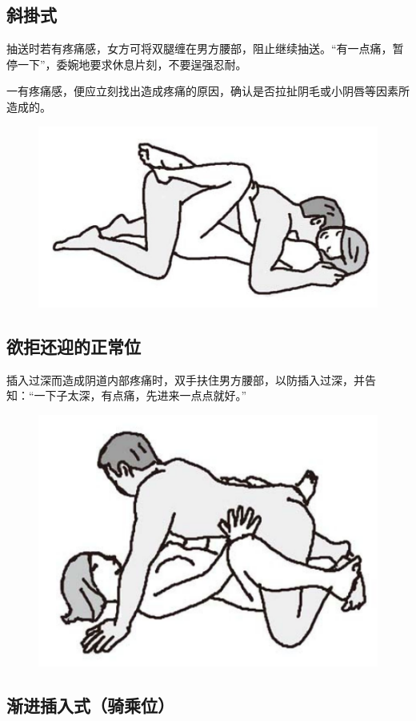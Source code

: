\documentclass[12pt,UTF8]{ctexbook}
\begin{document}
\subsection{斜掛式}

抽送时若有疼痛感，女方可将双腿缠在男方腰部，阻止继续抽送。“有一点痛，暂停一下”，委婉地要求休息片刻，不要逞强忍耐。

一有疼痛感，便应立刻找出造成疼痛的原因，确认是否拉扯阴毛或小阴唇等因素所造成的。

\begin{figure}[htbp]
\centering
\includegraphics[width=0.7\linewidth]{tw19}
\caption{}
\label{fig:1}
\end{figure}

\subsection{欲拒还迎的正常位}

插入过深而造成阴道内部疼痛时，双手扶住男方腰部，以防插入过深，并告知：“一下子太深，有点痛，先进来一点点就好。”

\begin{figure}[htbp]
\centering
\includegraphics[width=0.7\linewidth]{tw20}
\caption{}
\label{fig:1}
\end{figure}

\subsection{渐进插入式（骑乘位）}
\end{document}
